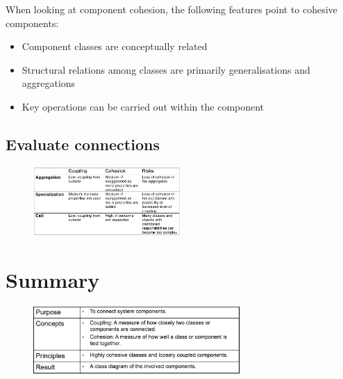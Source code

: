 When looking at component cohesion, the following features point to cohesive components:
\begin{itemize}
    \item Component classes are conceptually related
    \item Structural relations among classes are primarily generalisations and aggregations
    \item Key operations can be carried out within the component
\end{itemize}

\subsection{Evaluate connections}

\begin{figure}[H]
    \centering
    \includegraphics[width=0.5\textwidth]{figures/evaluateconnections.png}
\end{figure}

\section{Summary}

\begin{figure}[H]
    \centering
    \includegraphics[width=0.7\textwidth]{figures/connectingcomponentssummary.png}
\end{figure}